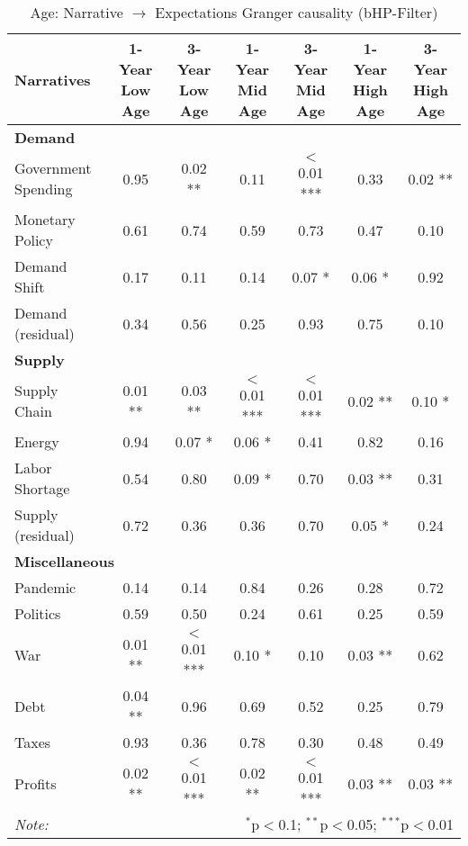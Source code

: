 \begin{sidewaystable}[H]
\centering
\footnotesize
\caption{Age: Narrative $\rightarrow$ Expectations Granger causality (bHP-Filter)}\label{tab:granger_bHP_age}

\begin{tabular}{lcccccc}
\toprule
\textbf{Narratives} & \textbf{1-Year Low Age} & \textbf{3-Year Low Age} & \textbf{1-Year Mid Age} & \textbf{3-Year Mid Age} & \textbf{1-Year High Age} & \textbf{3-Year High Age} \\
\midrule
\multicolumn{7}{l}{\textbf{Demand}} \\
\midrule
Government Spending & 0.95 & 0.02 ** & 0.11 & $<$0.01 *** & 0.33 & 0.02 ** \\
Monetary Policy & 0.61 & 0.74 & 0.59 & 0.73 & 0.47 & 0.10 \\
Demand Shift & 0.17 & 0.11 & 0.14 & 0.07 * & 0.06 * & 0.92 \\
Demand (residual) & 0.34 & 0.56 & 0.25 & 0.93 & 0.75 & 0.10 \\
\midrule
\multicolumn{7}{l}{\textbf{Supply}} \\
\midrule
Supply Chain & 0.01 ** & 0.03 ** & $<$0.01 *** & $<$0.01 *** & 0.02 ** & 0.10 * \\
Energy & 0.94 & 0.07 * & 0.06 * & 0.41 & 0.82 & 0.16 \\
Labor Shortage & 0.54 & 0.80 & 0.09 * & 0.70 & 0.03 ** & 0.31 \\
Supply (residual) & 0.72 & 0.36 & 0.36 & 0.70 & 0.05 * & 0.24 \\
\midrule
\multicolumn{7}{l}{\textbf{Miscellaneous}} \\
\midrule
Pandemic & 0.14 & 0.14 & 0.84 & 0.26 & 0.28 & 0.72 \\
Politics & 0.59 & 0.50 & 0.24 & 0.61 & 0.25 & 0.59 \\
War & 0.01 ** & $<$0.01 *** & 0.10 * & 0.10 & 0.03 ** & 0.62 \\
Debt & 0.04 ** & 0.96 & 0.69 & 0.52 & 0.25 & 0.79 \\
Taxes & 0.93 & 0.36 & 0.78 & 0.30 & 0.48 & 0.49 \\
Profits & 0.02 ** & $<$0.01 *** & 0.02 ** & $<$0.01 *** & 0.03 ** & 0.03 ** \\
\midrule
\bottomrule
\textit{Note:}  & \multicolumn{6}{r}{$^{*}$p$<$0.1; $^{**}$p$<$0.05; $^{***}$p$<$0.01} \\
\bottomrule
\end{tabular}
\end{sidewaystable}
